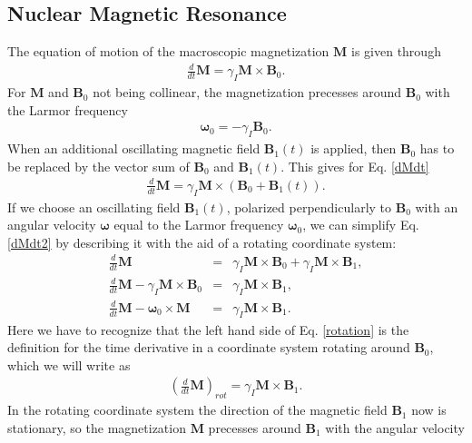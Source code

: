 \documentclass[a4paper,10pt]{article}
\begin{document}
\subsection{Nuclear Magnetic Resonance}
The equation of motion of the macroscopic magnetization $\mathbf{M}$ is given through
\begin{eqnarray}
 \frac{d}{dt}\mathbf{M} = \gamma_I\mathbf{M}\times\mathbf{B}_0. \label{dMdt}
\end{eqnarray}
For $\mathbf{M}$ and $\mathbf{B}_0$ not being collinear, the magnetization precesses around $\mathbf{B}_0$ with the Larmor frequency
\begin{eqnarray}
 \mathbf{\omega}_0 = -\gamma_I \mathbf{B}_0.
\end{eqnarray} 
When an additional oscillating magnetic field $\mathbf{B}_1(t)$ is applied, then $\mathbf{B}_0$ has to be replaced by the vector sum of $\mathbf{B}_0$ 
and $\mathbf{B}_1(t)$. This gives for Eq. \eqref{dMdt}
\begin{eqnarray}
 \frac{d}{dt}\mathbf{M} = \gamma_I\mathbf{M}\times \left(\mathbf{B}_0+\mathbf{B}_1(t) \right). \label{dMdt2}
\end{eqnarray}
If we choose an oscillating field $\mathbf{B}_1(t)$, polarized perpendicularly to $\mathbf{B}_0$ with an angular velocity $\mathbf{\omega}$ equal to the Larmor frequency $\mathbf{\omega}_0$, we can simplify Eq. \eqref{dMdt2} by describing it with the aid of a rotating coordinate system:  
\begin{eqnarray}
 \frac{d}{dt}\mathbf{M} &=& \gamma_I \mathbf{M} \times \mathbf{B}_0 + \gamma_I \mathbf{M} \times \mathbf{B}_1,\\
 \frac{d}{dt}\mathbf{M} - \gamma_I \mathbf{M} \times \mathbf{B}_0 &=& \gamma_I \mathbf{M} \times \mathbf{B}_1,\\
 \frac{d}{dt}\mathbf{M} - \mathbf{\omega}_0\times \mathbf{M} &=& \gamma_I \mathbf{M} \times \mathbf{B}_1. \label{rotation}
\end{eqnarray}
Here we have to recognize that the left hand side of Eq. \eqref{rotation} is the definition for the time derivative in a coordinate system rotating around $\mathbf{B}_0$, which we will write as 
\begin{eqnarray}
 \left( \frac{d}{dt} \mathbf{M} \right)_{rot} = \gamma_I \mathbf{M} \times \mathbf{B}_1.
\end{eqnarray}
In the rotating coordinate system the direction of the magnetic field $\mathbf{B}_1$ now is stationary, so the magnetization $\mathbf{M}$ precesses around $\mathbf{B}_1$ with the angular velocity
\end{document}
